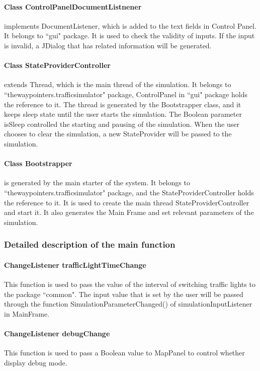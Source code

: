 \documentclass[a4paper,12pt]{article}
\begin{document}
\paragraph{Class ControlPanelDocumentListnener} implements DocumentListener, which is added to the text fields in Control Panel. It belongs to ``gui" package. It is used to check the validity of inputs. If the input is invalid, a JDialog that has related information will be generated.
\paragraph{Class StateProviderController} extends Thread, which is the main thread of the simulation. It belongs to ``thewaypointers.trafficsimulator" package, ControlPanel in ``gui" package holds the reference to it. The thread is generated by the Bootstrapper class, and it keeps sleep state until the user starts the simulation. The Boolean parameter isSleep controlled the starting and pausing of the simulation. When the user chooses to clear the simulation, a new StateProvider will be passed to the simulation.
\paragraph{Class Bootstrapper} is generated by the main starter of the system. It belongs to ``thewaypointers.trafficsimulator" package, and the StateProviderController holds the reference to it. It is used to create the main thread StateProviderController and start it. It also generates the Main Frame and set relevant parameters of the simulation.


\subsubsection{Detailed description of the main function}

\paragraph{ChangeListener trafficLightTimeChange} This function is used to pass the value of the interval of switching traffic lights to the package ``common". The input value that is set by the user will be passed through the function SimulationParameterChanged() of simulationInputListener in MainFrame.
\paragraph{ChangeListener debugChange} This function is used to pass a Boolean value to MapPanel to control whether display debug mode.
\end{document}
